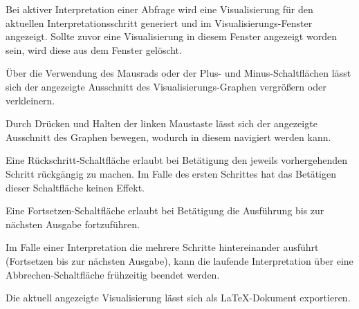 \documentclass[parskip=full,11pt,twoside]{scrartcl}
\begin{document}

Bei aktiver Interpretation einer Abfrage wird eine Visualisierung für den aktuellen Interpretationsschritt generiert und im Visualisierungs-Fenster angezeigt. Sollte zuvor eine Visualisierung in diesem Fenster angezeigt worden sein, wird diese aus dem Fenster gelöscht.


Über die Verwendung des Mausrads oder der Plus- und Minus-Schaltflächen lässt sich der angezeigte Ausschnitt des Visualisierungs-Graphen vergrößern oder verkleinern.


Durch Drücken und Halten der linken Maustaste lässt sich der angezeigte Ausschnitt des Graphen bewegen, wodurch in diesem navigiert werden kann.


Eine Rückschritt-Schaltfläche erlaubt bei Betätigung den jeweils vorhergehenden Schritt rückgängig zu machen. Im Falle des ersten Schrittes hat das Betätigen dieser Schaltfläche keinen Effekt.


Eine Fortsetzen-Schaltfläche erlaubt bei Betätigung die Ausführung bis zur nächsten Ausgabe fortzuführen.


Im Falle einer Interpretation die mehrere Schritte hintereinander ausführt (Fortsetzen bis zur nächsten Ausgabe), kann die laufende Interpretation über eine Abbrechen-Schaltfläche frühzeitig beendet werden.


Die aktuell angezeigte Visualisierung lässt sich als LaTeX-Dokument exportieren.

\end{document}
